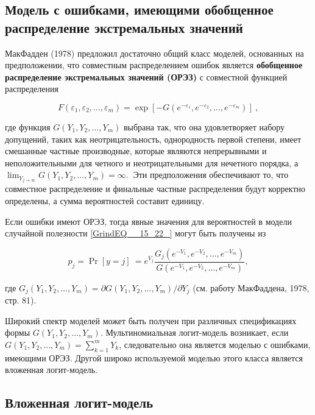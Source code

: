 \subsection{Модель с ошибками, имеющими обобщенное распределение экстремальных значений}

МакФадден (1978) предложил достаточно общий класс моделей, основанных на предположении, что совместным распределением ошибок является \textbf{обобщенное распределение экстремальных значений (ОРЭЗ) } с совместной функцией распределения 

\begin{equation} 
\label{GrindEQ__15_30_} 
F\left({\varepsilon }_1,{\varepsilon }_2,\dots ,{\varepsilon }_m\right)={\exp  \left[-G\left(e^{-{\varepsilon }_1},e^{-{\varepsilon }_2},\dots ,e^{-{\varepsilon }_m}\right)\right]\ }, 
\end{equation} 

где функция $G(Y_1,Y_2,\dots ,Y_m)$ выбрана так, что она удовлетворяет набору допущений, таких как неотрицательность, однородность первой степени, имеет смешанные частные производные, которые являются непрерывными и неположительными для четного и неотрицательными для нечетного порядка, а ${\mathop{\lim }_{Y_{j\to \infty }} G\left(Y_1,Y_2,\dots ,Y_m\right)=\infty .\ }$ Эти предположения обеспечивают то, что совместное распределение и финальные частные распределения будут корректно определены, а сумма вероятностей составит единицу. 

Если ошибки имеют ОРЭЗ, тогда явные значения для вероятностей в модели случайной полезности \eqref{GrindEQ__15_22_} могут быть получены из

\begin{equation} \label{GrindEQ__15_31_} p_j={\Pr  \left[y=j\right]\ }=e^{V_j}\frac{G_j(e^{-V_1},e^{-V_2},\dots ,e^{-V_m})}{G(e^{-V_1},e^{-V_2},\dots ,e^{-V_m})}, \end{equation} 

где $G_j\left(Y_1,Y_2,\dots ,Y_m\right)={\partial G(Y_1,Y_2,\dots ,Y_m)}/{\partial }Y_j$ (см. работу МакФаддена, 1978, стр. 81).

Широкий спектр моделей может быть получен при различных спецификациях формы $G\left(Y_1,Y_2,\dots ,Y_m\right).$ Мультиномиальная логит-модель возникает, если $G\left(Y_1,Y_2,\dots ,Y_m\right)=\sum^m_{k=1}{Y_k}$, следовательно она является моделью с ошибками, имеющими ОРЭЗ. Другой широко используемой моделью этого класса является вложенная логит-модель.

\subsection{Вложенная логит-модель}

